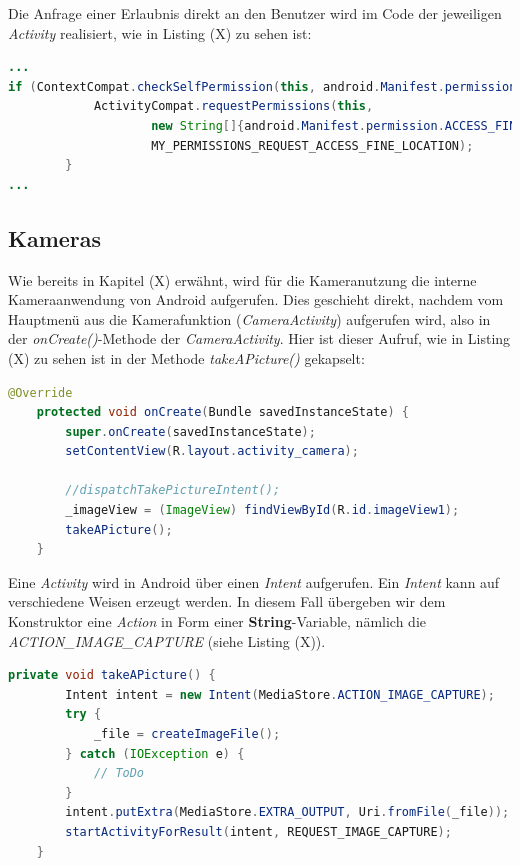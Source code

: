 Die Anfrage einer Erlaubnis direkt an den Benutzer wird im Code der jeweiligen \textit{Activity} realisiert, wie in Listing (X) zu sehen ist:
\clearpage

\begin{lstlisting}[caption=Generierung der Anfrage für die Erlaubnis einen Dienst zu nutzen an den Benutzer, label=lst:requestPermission, language=Java]
...
if (ContextCompat.checkSelfPermission(this, android.Manifest.permission.ACCESS_FINE_LOCATION) != PackageManager.PERMISSION_GRANTED) {
            ActivityCompat.requestPermissions(this,
                    new String[]{android.Manifest.permission.ACCESS_FINE_LOCATION},
                    MY_PERMISSIONS_REQUEST_ACCESS_FINE_LOCATION);
        }
...
\end{lstlisting} 

\subsection{Kameras}

Wie bereits in Kapitel (X) erwähnt, wird für die Kameranutzung die interne Kameraanwendung von Android aufgerufen. Dies geschieht direkt, nachdem vom Hauptmenü aus die Kamerafunktion (\textit{CameraActivity}) aufgerufen wird, also in der \textit{onCreate()}-Methode der \textit{CameraActivity}. Hier ist dieser Aufruf, wie in Listing (X) zu sehen ist in der Methode \textit{takeAPicture()} gekapselt:

\begin{lstlisting}[caption=Aufruf der Android-Kamerafunktion in der \textit{onCreate()}-Methode der Klasse \textit{CameraActivity}, label=lst:callTakeAPic, language=Java]
@Override
    protected void onCreate(Bundle savedInstanceState) {
        super.onCreate(savedInstanceState);
        setContentView(R.layout.activity_camera);

        //dispatchTakePictureIntent();
        _imageView = (ImageView) findViewById(R.id.imageView1);
        takeAPicture();
    }
\end{lstlisting}  

Eine \textit{Activity} wird in Android über einen \textit{Intent} aufgerufen. Ein \textit{Intent} kann auf verschiedene Weisen erzeugt werden. In diesem Fall übergeben wir dem Konstruktor eine \textit{Action} in Form einer \textbf{String}-Variable, nämlich die \textit{ACTION\_IMAGE\_CAPTURE} (siehe Listing (X)).
\clearpage

\begin{lstlisting}[caption=Methode \textit{takeAPicture()}: Aufruf der Android-Kamerafunktion über einen \textit{Intent}, label=lst:IntentCamera, language=Java]
private void takeAPicture() {
        Intent intent = new Intent(MediaStore.ACTION_IMAGE_CAPTURE);
        try {
            _file = createImageFile();
        } catch (IOException e) {
            // ToDo
        }
        intent.putExtra(MediaStore.EXTRA_OUTPUT, Uri.fromFile(_file));
        startActivityForResult(intent, REQUEST_IMAGE_CAPTURE);
    }
\end{lstlisting}  

